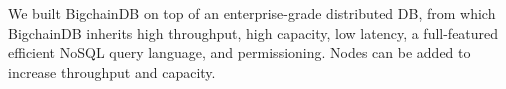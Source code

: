 
We built BigchainDB on top of an enterprise-grade distributed DB, from which
BigchainDB inherits high throughput, high capacity, low latency, a full-featured efficient NoSQL query language, and permissioning.
Nodes can be added to increase throughput and capacity.

